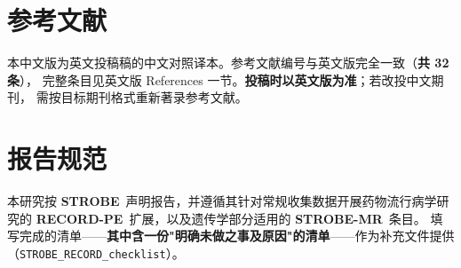 \documentclass[UTF8,fontset=windows,11pt]{ctexart}
\begin{document}
\section{参考文献}

本中文版为英文投稿稿的中文对照译本。参考文献编号与英文版完全一致（\textbf{共 32 条}）， 完整条目见英文版 References 一节。\textbf{投稿时以英文版为准}；若改投中文期刊， 需按目标期刊格式重新著录参考文献。

\section{报告规范}

本研究按 \textbf{STROBE}\ 声明报告，并遵循其针对常规收集数据开展药物流行病学研究的 \textbf{RECORD-PE}\ 扩展，以及遗传学部分适用的 \textbf{STROBE-MR}\ 条目。 填写完成的清单——\textbf{其中含一份"明确未做之事及原因"的清单}——作为补充文件提供 （\texttt{STROBE\_RECORD\_checklist}）。
\end{document}
